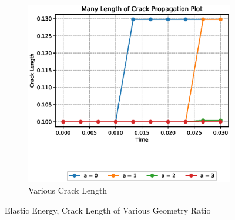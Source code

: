 \documentclass[a4paper,11pt]{article}
\begin{document}
\begin{figure}[h!]
\begin{subfigure}[b]{0.49\linewidth}
		\includegraphics[width=\linewidth]{picture/conference/manycracklength-gvar}
		\caption{Various Crack Length}
		\label{fig:manycracklength-gvar}
	\end{subfigure}
	\caption{Elastic Energy, Crack Length of Various Geometry Ratio}
	\label{fig:gvar}
\end{figure}
\end{document}
